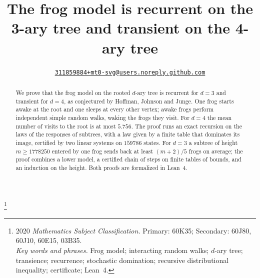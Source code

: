 \documentclass[11pt]{amsart}
\makeatletter
\newcommand{\repo}{https://github.com/mt0-svg/frog-model-tree}
\DeclareRobustCommand{\authorlink}{\href{\repo/issues/new/choose}{\nolinkurl{311859884+mt0-svg@users.noreply.github.com}}}
\theoremstyle{definition}
\numberwithin{equation}{section}
\makeatother
\begin{document}
\title[The frog model on the 3-ary and 4-ary trees]{The frog model is recurrent on the 3-ary tree and transient on the 4-ary tree}
\author{\authorlink}
\thanks{2020 {\em Mathematics Subject Classification.} Primary: 60K35; Secondary: 60J80, 60J10, 60E15, 03B35.\\\indent
{\em Key words and phrases.} Frog model; interacting random walks; $d$-ary tree; transience; recurrence; stochastic domination; recursive distributional inequality; certificate; Lean~4.}

\begin{abstract}
We prove that the frog model on the rooted $d$-ary tree is recurrent for $d=3$ and transient for $d=4$, as conjectured by Hoffman, Johnson and Junge. One frog starts awake at the root and one sleeps at every other vertex; awake frogs perform independent simple random walks, waking the frogs they visit. For $d=4$ the mean number of visits to the root is at most $5.756$. The proof runs an exact recursion on the laws of the responses of subtrees, with a law given by a finite table that dominates its image, certified by two linear systems on $159786$ states. For $d=3$ a subtree of height $m\ge1778250$ entered by one frog sends back at least $(m+2)/5$ frogs on average; the proof combines a lower model, a certified chain of steps on finite tables of bounds, and an induction on the height. Both proofs are formalized in Lean~4.

\end{abstract}

\maketitle
\end{document}
